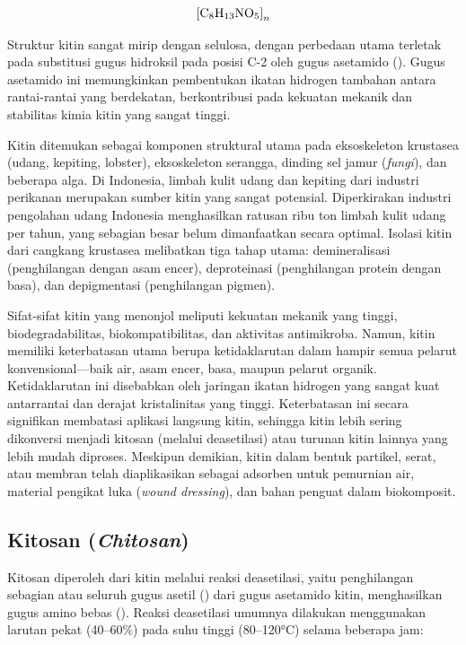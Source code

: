 \documentclass[12pt,a4paper,openany]{book}
\begin{document}
\begin{equation}
\ce{[C8H13NO5]}_n
\end{equation}

Struktur kitin sangat mirip dengan selulosa, dengan perbedaan utama terletak pada substitusi gugus hidroksil pada posisi C-2 oleh gugus asetamido (). Gugus asetamido ini memungkinkan pembentukan ikatan hidrogen tambahan antara rantai-rantai yang berdekatan, berkontribusi pada kekuatan mekanik dan stabilitas kimia kitin yang sangat tinggi.

Kitin ditemukan sebagai komponen struktural utama pada eksoskeleton krustasea (udang, kepiting, lobster), eksoskeleton serangga, dinding sel jamur (\textit{fungi}), dan beberapa alga. Di Indonesia, limbah kulit udang dan kepiting dari industri perikanan merupakan sumber kitin yang sangat potensial. Diperkirakan industri pengolahan udang Indonesia menghasilkan ratusan ribu ton limbah kulit udang per tahun, yang sebagian besar belum dimanfaatkan secara optimal. Isolasi kitin dari cangkang krustasea melibatkan tiga tahap utama: demineralisasi (penghilangan  dengan asam encer), deproteinasi (penghilangan protein dengan basa), dan depigmentasi (penghilangan pigmen).

Sifat-sifat kitin yang menonjol meliputi kekuatan mekanik yang tinggi, biodegradabilitas, biokompatibilitas, dan aktivitas antimikroba. Namun, kitin memiliki keterbatasan utama berupa ketidaklarutan dalam hampir semua pelarut konvensional---baik air, asam encer, basa, maupun pelarut organik. Ketidaklarutan ini disebabkan oleh jaringan ikatan hidrogen yang sangat kuat antarrantai dan derajat kristalinitas yang tinggi. Keterbatasan ini secara signifikan membatasi aplikasi langsung kitin, sehingga kitin lebih sering dikonversi menjadi kitosan (melalui deasetilasi) atau turunan kitin lainnya yang lebih mudah diproses. Meskipun demikian, kitin dalam bentuk partikel, serat, atau membran telah diaplikasikan sebagai adsorben untuk pemurnian air, material pengikat luka (\textit{wound dressing}), dan bahan penguat dalam biokomposit.

\subsection{Kitosan (\textit{Chitosan})}
\label{subsec:kitosan}

Kitosan diperoleh dari kitin melalui reaksi deasetilasi, yaitu penghilangan sebagian atau seluruh gugus asetil () dari gugus asetamido kitin, menghasilkan gugus amino bebas (). Reaksi deasetilasi umumnya dilakukan menggunakan larutan  pekat (40--60\%) pada suhu tinggi (80--120°C) selama beberapa jam:
\end{document}
